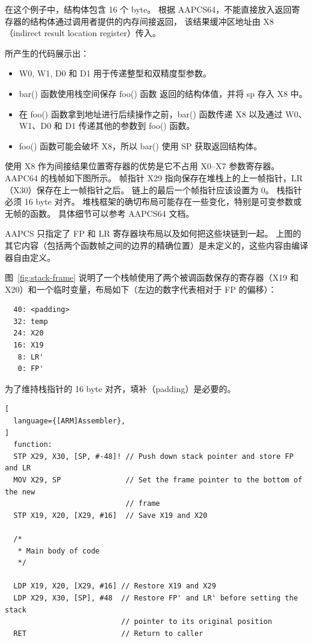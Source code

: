 在这个例子中，结构体包含 16 个 byte。
根据 AAPCS64，不能直接放入返回寄存器的结构体通过调用者提供的内存间接返回，
该结果缓冲区地址由 X8（indirect result location register）传入。

所产生的代码展示出：

\begin{itemize}
  \item W0, W1, D0 和 D1 用于传递整型和双精度型参数。
  \item bar() 函数使用栈空间保存 foo() 函数 返回的结构体值，并将 sp 存入 X8 中。
  \item 在 foo() 函数拿到地址进行后续操作之前，bar() 函数传递 X8 以及通过 W0、W1、D0 和 D1 传递其他的参数到 foo() 函数。
  \item foo() 函数可能会破坏 X8，所以 bar() 使用 SP 获取返回结构体。
\end{itemize}

使用 X8 作为间接结果位置寄存器的优势是它不占用 X0--X7 参数寄存器。
AAPC64 的栈帧如下图所示。
帧指针 X29 指向保存在堆栈上的上一帧指针，LR（X30）保存在上一帧指针之后。
链上的最后一个帧指针应该设置为 0。
栈指针必须 16 byte 对齐。
堆栈框架的确切布局可能存在一些变化，特别是可变参数或无帧的函数。
具体细节可以参考 AAPCS64 文档。


\begin{Tcbox}[title={Note}]
  AAPCS 只指定了 FP 和 LR 寄存器块布局以及如何把这些块链到一起。
  上图的其它内容（包括两个函数帧之间的边界的精确位置）是未定义的，这些内容由编译器自由定义。
\end{Tcbox}

图~\ref{fig:stack-frame} 说明了一个栈帧使用了两个被调函数保存的寄存器（X19 和 X20）和一个临时变量，布局如下（左边的数字代表相对于 FP 的偏移）：

\begin{lstlisting}
  40: <padding>
  32: temp
  24: X20
  16: X19
   8: LR'
   0: FP'
\end{lstlisting}

为了维持栈指针的 16 byte 对齐，填补（padding）是必要的。

\begin{lstlisting}[
  language={[ARM]Assembler},
]
  function:
  STP X29, X30, [SP, #-48]! // Push down stack pointer and store FP and LR
  MOV X29, SP               // Set the frame pointer to the bottom of the new
                            // frame
  STP X19, X20, [X29, #16]  // Save X19 and X20

  /*
   * Main body of code
   */

  LDP X19, X20, [X29, #16] // Restore X19 and X29
  LDP X29, X30, [SP], #48  // Restore FP' and LR' before setting the stack
                           // pointer to its original position
  RET                      // Return to caller
\end{lstlisting}

